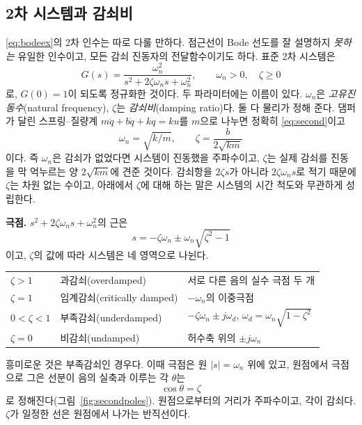\documentclass[11pt]{article}
\begin{document}

\subsection{2차 시스템과 감쇠비}\label{sec:second}
\eqref{eq:bodeex}의 2차 인수는 따로 다룰 만하다. 점근선이 Bode 선도를 잘
설명하지 \emph{못하는} 유일한 인수이고, 모든 감쇠 진동자의 전달함수이기도 하다.
표준 2차 시스템은
\begin{equation}\label{eq:second}
   G(s) = \frac{\omega_n^{2}}{s^{2}+2\zeta\omega_n s+\omega_n^{2}},
   \qquad \omega_n>0,\quad \zeta\ge 0
\end{equation}
로, $G(0)=1$이 되도록 정규화한 것이다. 두 파라미터에는 이름이 있다. $\omega_n$은
\emph{고유진동수}(natural frequency), $\zeta$는 \emph{감쇠비}(damping ratio)다.
둘 다 물리가 정해 준다. 댐퍼가 달린 스프링--질량계 $m\ddot q+b\dot q+kq=ku$를
$m$으로 나누면 정확히 \eqref{eq:second}이고
\begin{equation}\label{eq:zetawn}
   \omega_n = \sqrt{k/m},\qquad
   \zeta = \frac{b}{2\sqrt{km}}
\end{equation}
이다. 즉 $\omega_n$은 감쇠가 없었다면 시스템이 진동했을 주파수이고, $\zeta$는
실제 감쇠를 진동을 막 억누르는 양 $2\sqrt{km}$에 견준 것이다. 감쇠항을
$2\zeta s$가 아니라 $2\zeta\omega_n s$로 적기 때문에 $\zeta$는 차원 없는 수이고,
아래에서 $\zeta$에 대해 하는 말은 시스템의 시간 척도와 무관하게 성립한다.

\smallskip\noindent\textbf{극점.} $s^{2}+2\zeta\omega_n s+\omega_n^{2}$의 근은
\[
   s = -\zeta\omega_n \pm \omega_n\sqrt{\zeta^{2}-1}
\]
이고, $\zeta$의 값에 따라 시스템은 네 영역으로 나뉜다.
\begin{center}\small
\renewcommand{\arraystretch}{1.3}
\begin{tabular}{@{}lll@{}}
\toprule
$\zeta>1$   & 과감쇠(overdamped)        & 서로 다른 음의 실수 극점 두 개\\
$\zeta=1$   & 임계감쇠(critically damped) & $-\omega_n$의 이중극점\\
$0<\zeta<1$ & 부족감쇠(underdamped)       & $-\zeta\omega_n\pm j\omega_d$, \quad $\omega_d=\omega_n\sqrt{1-\zeta^{2}}$\\
$\zeta=0$   & 비감쇠(undamped)          & 허수축 위의 $\pm j\omega_n$\\
\bottomrule
\end{tabular}
\end{center}
흥미로운 것은 부족감쇠인 경우다. 이때 극점은 원 $|s|=\omega_n$ 위에 있고, 원점에서
극점으로 그은 선분이 음의 실축과 이루는 각 $\theta$는
\begin{equation}\label{eq:zetaangle}
   \cos\theta = \zeta
\end{equation}
로 정해진다(그림~\ref{fig:secondpoles}). 원점으로부터의 거리가 주파수이고, 각이
감쇠다. $\zeta$가 일정한 선은 원점에서 나가는 반직선이다.
\end{document}
